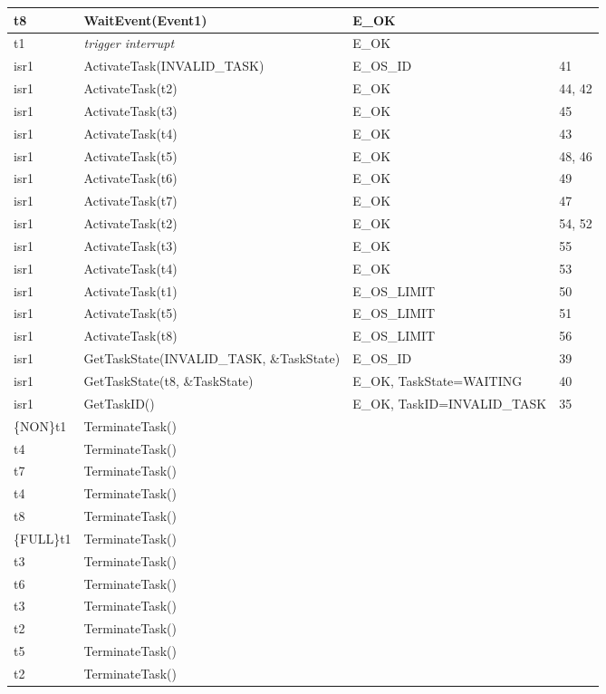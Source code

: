 \documentclass[10pt]{article}
\newlength{\Li}\settowidth{\Li}{Running}
\newlength{\Lii}\setlength{\Lii}{7cm}
\newlength{\Liiii}\setlength{\Liiii}{0.9cm}
\newlength{\Liii}\setlength{\Liii}{\textwidth} \addtolength{\Liii}{-\Li} \addtolength{\Liii}{-\Lii} \addtolength{\Liii}{-\Liiii}
\begin{document}
	\begin{supertabular}{|p{\Li}|p{\Lii}|p{\Liii}|p{\Liiii}|} \hline 
	t8	& WaitEvent(Event1) 						& E\_OK					& \\ \hline 
	t1	& \textit{trigger interrupt}						& E\_OK					& \\ \hline 
	isr1	& ActivateTask(INVALID\_TASK)				& E\_OS\_ID				& 41 \\ \hline 
	isr1	& ActivateTask(t2) 							& E\_OK					& 44, 42 \\ \hline 
	isr1	& ActivateTask(t3) 							& E\_OK					& 45 \\ \hline 
	isr1	& ActivateTask(t4) 							& E\_OK					& 43 \\ \hline 
	isr1	& ActivateTask(t5) 							& E\_OK					& 48, 46 \\ \hline 
	isr1	& ActivateTask(t6) 							& E\_OK					& 49 \\ \hline 
	isr1	& ActivateTask(t7) 							& E\_OK					& 47 \\ \hline 
	isr1	& ActivateTask(t2) 							& E\_OK					& 54, 52 \\ \hline 
	isr1	& ActivateTask(t3) 							& E\_OK					& 55 \\ \hline 
	isr1	& ActivateTask(t4) 							& E\_OK					& 53 \\ \hline 
	isr1	& ActivateTask(t1) 							& E\_OS\_LIMIT			& 50 \\ \hline 
	isr1	& ActivateTask(t5) 							& E\_OS\_LIMIT			& 51 \\ \hline 
	isr1	& ActivateTask(t8) 							& E\_OS\_LIMIT			& 56 \\ \hline 
	isr1	& GetTaskState(INVALID\_TASK, \&TaskState)		& E\_OS\_ID				& 39 \\ \hline 
	isr1	& GetTaskState(t8, \&TaskState)				& E\_OK, TaskState=WAITING	& 40 \\ \hline 
	isr1	& GetTaskID()			 					& E\_OK, TaskID=INVALID\_TASK		& 35 \\ \hline 
	\{NON\}t1	& TerminateTask()						& 		 				&  \\ \hline 
	t4	& TerminateTask()							& 		 				&  \\ \hline 
	t7	& TerminateTask()							& 		 				&  \\ \hline 
	t4	& TerminateTask()							& 		 				&  \\ \hline 
	t8	& TerminateTask()							& 		 				&  \\ \hline 
	\{FULL\}t1	& TerminateTask()						& 		 				&  \\ \hline
	t3	& TerminateTask()							& 		 				&  \\ \hline 
	t6	& TerminateTask()							& 		 				&  \\ \hline 
	t3	& TerminateTask()							& 		 				&  \\ \hline 
	t2	& TerminateTask()							& 		 				&  \\ \hline 
	t5	& TerminateTask()							& 		 				&  \\ \hline 
	t2	& TerminateTask()							& 		 				&  \\ \hline 
	\end{supertabular} \\
    
\end{document}
